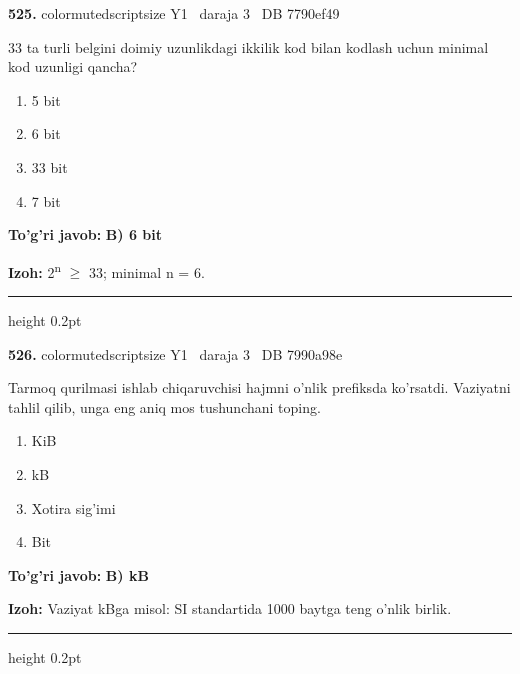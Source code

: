 \documentclass[10pt,a4paper,oneside]{article}
\begin{document}
\noindent\textbf{\color{ink}525.}  {color{muted}scriptsize Y1 \textbullet\ daraja 3 \textbullet\ DB 7790ef49}
\par
33 ta turli belgini doimiy uzunlikdagi ikkilik kod bilan kodlash uchun minimal kod uzunligi qancha?
\begin{enumerate}[label=\Alph*),leftmargin=9mm]
\item 5 bit
\item 6 bit
\item 33 bit
\item 7 bit
\end{enumerate}
\begin{tcolorbox}[enhanced,breakable,colback=teal!4,colframe=teal!50!black,boxrule=0.5pt,arc=1.1mm,left=3mm,right=3mm,top=1.7mm,bottom=1.7mm,before skip=2mm,after skip=2mm]
\textbf{\color{teal}To'g'ri javob:} \textbf{B) 6 bit}
\par\smallskip
\textbf{Izoh:} 2\textsuperscript{n} \ensuremath{\geq} 33; minimal n = 6.
\end{tcolorbox}
\vspace{2mm}\hrule height 0.2pt \vspace{3mm}

\noindent\textbf{\color{ink}526.}  {color{muted}scriptsize Y1 \textbullet\ daraja 3 \textbullet\ DB 7990a98e}
\par
Tarmoq qurilmasi ishlab chiqaruvchisi hajmni o'nlik prefiksda ko'rsatdi. Vaziyatni tahlil qilib, unga eng aniq mos tushunchani toping.
\begin{enumerate}[label=\Alph*),leftmargin=9mm]
\item KiB
\item kB
\item Xotira sig'imi
\item Bit
\end{enumerate}
\begin{tcolorbox}[enhanced,breakable,colback=teal!4,colframe=teal!50!black,boxrule=0.5pt,arc=1.1mm,left=3mm,right=3mm,top=1.7mm,bottom=1.7mm,before skip=2mm,after skip=2mm]
\textbf{\color{teal}To'g'ri javob:} \textbf{B) kB}
\par\smallskip
\textbf{Izoh:} Vaziyat kBga misol: SI standartida 1000 baytga teng o'nlik birlik.
\end{tcolorbox}
\vspace{2mm}\hrule height 0.2pt \vspace{3mm}
\end{document}
